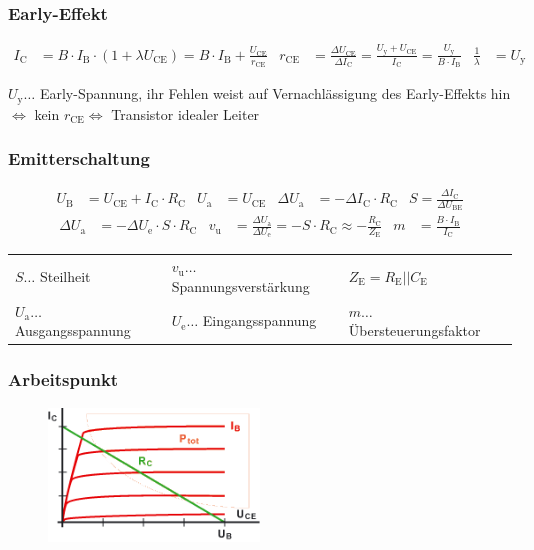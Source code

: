 		\subsubsection{Early-Effekt}
			\begin{align*}
				I_{\mathrm{C}}&=B\cdot I_{\mathrm{B}}\cdot(1+\lambda U_{\mathrm{CE}})=B\cdot I_{\mathrm{B}}+\frac{U_{\mathrm{CE}}}{r_{\mathrm{CE}}} 
				& r_{\mathrm{CE}}&=\frac{\Delta U_{\mathrm{CE}}}{\Delta I_{\mathrm{C}}}=\frac{U_{\mathrm{y}}+U_{\mathrm{CE}}}{I_{\mathrm{C}}}=\frac{U_{\mathrm{y}}}{B\cdot I_{\mathrm{B}}}
				& \frac{1}{\lambda} &= U_{\mathrm{y}}
			\end{align*}

			$U_{\mathrm{y}}\dots$ Early-Spannung, ihr Fehlen weist auf Vernachlässigung des Early-Effekts hin $\Leftrightarrow$ kein $r_{\mathrm{CE}} \Leftrightarrow$ Transistor idealer Leiter

		\subsubsection{Emitterschaltung}
			\begin{align*}
				U_{\mathrm{B}}&=U_{\mathrm{CE}}+I_{\mathrm{C}}\cdot R_{\mathrm{C}} 
				& U_{\mathrm{a}}&=U_{\mathrm{CE}} & \Delta U_{\mathrm{a}}&=-\Delta I_{\mathrm{C}}\cdot R_{\mathrm{C}} 
				& S=\frac{\Delta I_{\mathrm{C}}}{\Delta U_{\mathrm{BE}}}
			\end{align*}
			\begin{align*}
				\Delta U_{\mathrm{a}}&=-\Delta U_{\mathrm{e}}\cdot S\cdot R_{\mathrm{C}} 
				& v_{\mathrm{u}}&=\frac{\Delta U_{\mathrm{a}}}{\Delta U_{\mathrm{e}}}=-S\cdot R_{\mathrm{C}}
				\approx -\frac{R_{\mathrm{C}}}{Z_{\mathrm{E}}}
				& m&=\frac{B\cdot I_{\mathrm{B}}}{I_{\mathrm{C}}}
			\end{align*}
			\begin{table}[h]
			\begin{tabular}{lll}
			$S\dots$ Steilheit & $v_{\mathrm{u}}\dots$ Spannungsverstärkung & $Z_{\mathrm{E}}=R_{\mathrm{E}}||C_{\mathrm{E}}$\\
			$U_{\mathrm{a}}\dots$ Ausgangsspannung & $U_{\mathrm{e}}\dots$ Eingangsspannung & $m\dots$ Übersteuerungsfaktor \\
			\end{tabular}
			\end{table}

		\subsubsection{Arbeitspunkt}
			\begin{figure}[h]
				\includegraphics[width=0.5\textwidth]{images/arbeitsgerade}
			\end{figure}


